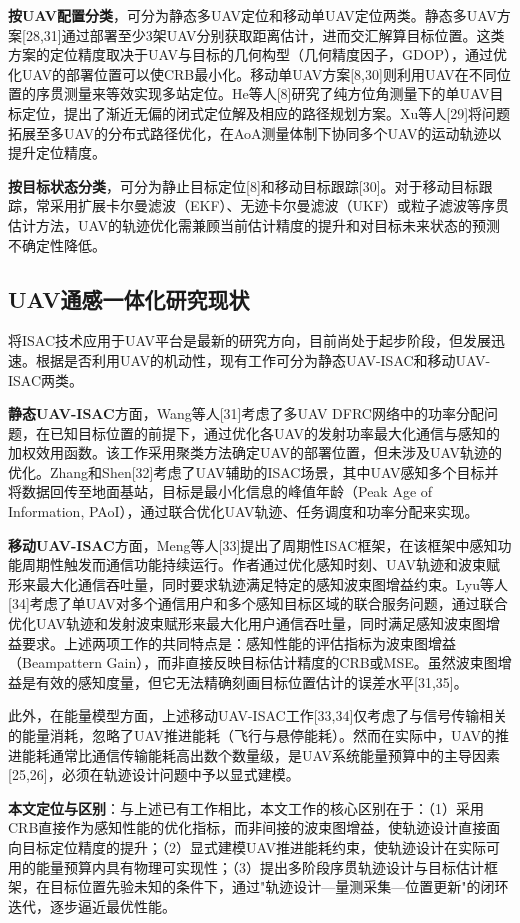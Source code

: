 \textbf{按UAV配置分类}，可分为静态多UAV定位和移动单UAV定位两类。静态多UAV方案[28,31]通过部署至少3架UAV分别获取距离估计，进而交汇解算目标位置。这类方案的定位精度取决于UAV与目标的几何构型（几何精度因子，GDOP），通过优化UAV的部署位置可以使CRB最小化。移动单UAV方案[8,30]则利用UAV在不同位置的序贯测量来等效实现多站定位。He等人[8]研究了纯方位角测量下的单UAV目标定位，提出了渐近无偏的闭式定位解及相应的路径规划方案。Xu等人[29]将问题拓展至多UAV的分布式路径优化，在AoA测量体制下协同多个UAV的运动轨迹以提升定位精度。

\textbf{按目标状态分类}，可分为静止目标定位[8]和移动目标跟踪[30]。对于移动目标跟踪，常采用扩展卡尔曼滤波（EKF）、无迹卡尔曼滤波（UKF）或粒子滤波等序贯估计方法，UAV的轨迹优化需兼顾当前估计精度的提升和对目标未来状态的预测不确定性降低。

\subsection{UAV通感一体化研究现状}

将ISAC技术应用于UAV平台是最新的研究方向，目前尚处于起步阶段，但发展迅速。根据是否利用UAV的机动性，现有工作可分为静态UAV-ISAC和移动UAV-ISAC两类。

\textbf{静态UAV-ISAC}方面，Wang等人[31]考虑了多UAV DFRC网络中的功率分配问题，在已知目标位置的前提下，通过优化各UAV的发射功率最大化通信与感知的加权效用函数。该工作采用聚类方法确定UAV的部署位置，但未涉及UAV轨迹的优化。Zhang和Shen[32]考虑了UAV辅助的ISAC场景，其中UAV感知多个目标并将数据回传至地面基站，目标是最小化信息的峰值年龄（Peak Age of Information, PAoI），通过联合优化UAV轨迹、任务调度和功率分配来实现。

\textbf{移动UAV-ISAC}方面，Meng等人[33]提出了周期性ISAC框架，在该框架中感知功能周期性触发而通信功能持续运行。作者通过优化感知时刻、UAV轨迹和波束赋形来最大化通信吞吐量，同时要求轨迹满足特定的感知波束图增益约束。Lyu等人[34]考虑了单UAV对多个通信用户和多个感知目标区域的联合服务问题，通过联合优化UAV轨迹和发射波束赋形来最大化用户通信吞吐量，同时满足感知波束图增益要求。上述两项工作的共同特点是：感知性能的评估指标为波束图增益（Beampattern Gain），而非直接反映目标估计精度的CRB或MSE。虽然波束图增益是有效的感知度量，但它无法精确刻画目标位置估计的误差水平[31,35]。

此外，在能量模型方面，上述移动UAV-ISAC工作[33,34]仅考虑了与信号传输相关的能量消耗，忽略了UAV推进能耗（飞行与悬停能耗）。然而在实际中，UAV的推进能耗通常比通信传输能耗高出数个数量级，是UAV系统能量预算中的主导因素[25,26]，必须在轨迹设计问题中予以显式建模。

\textbf{本文定位与区别}：与上述已有工作相比，本文工作的核心区别在于：（1）采用CRB直接作为感知性能的优化指标，而非间接的波束图增益，使轨迹设计直接面向目标定位精度的提升；（2）显式建模UAV推进能耗约束，使轨迹设计在实际可用的能量预算内具有物理可实现性；（3）提出多阶段序贯轨迹设计与目标估计框架，在目标位置先验未知的条件下，通过"轨迹设计—量测采集—位置更新"的闭环迭代，逐步逼近最优性能。


